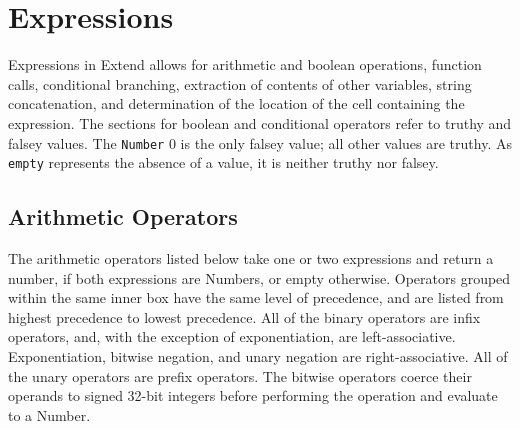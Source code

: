 \section{Expressions}
	Expressions in Extend allows for arithmetic and boolean operations, function calls, conditional branching,  extraction of contents of other variables, string concatenation, and determination of the location of the cell containing the expression. The sections for boolean and conditional operators refer to truthy and falsey values. The \texttt{Number} 0 is the only falsey value; all other values are truthy. As \texttt{empty} represents the absence of a value, it is neither truthy nor falsey.
	\pagebreak
		\subsection{Arithmetic Operators}
			The arithmetic operators listed below take one or two expressions and return a number, if both expressions are Numbers, or empty otherwise. Operators grouped within the same inner box have the same level of precedence, and are listed from highest precedence to lowest precedence. All of the binary operators are infix operators, and, with the exception of exponentiation, are left-associative. Exponentiation, bitwise negation, and unary negation are right-associative. All of the unary operators are prefix operators. The bitwise operators coerce their operands to signed 32-bit integers before performing the operation and evaluate to a Number.
